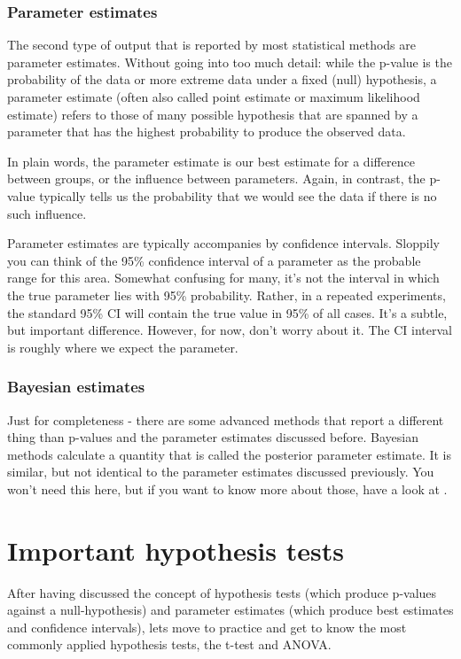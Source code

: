 \documentclass[a4paper,twoside]{tufte-book} %
\begin{document}
\subsection{Parameter estimates}

The second type of output that is reported by most statistical methods are parameter estimates. Without going into too much detail: while the p-value is the probability of the data or more extreme data under a fixed (null) hypothesis, a parameter estimate (often also called point estimate or maximum likelihood estimate) refers to those of many possible hypothesis that are spanned by a parameter that has the highest probability to produce the observed data. 

In plain words, the parameter estimate is our best estimate for a difference between groups, or the influence between parameters. Again, in contrast, the p-value typically tells us the probability that we would see the data if there is no such influence. 

Parameter estimates are typically accompanies by confidence intervals. Sloppily you can think of the 95\% confidence interval of a parameter as the probable range for this area. Somewhat confusing for many, it's not the interval in which the true parameter lies with 95\% probability. Rather, in a repeated experiments, the standard 95\% CI will contain the true value in 95\% of all cases. It's a subtle, but important difference. However, for now, don't worry about it. The CI interval is roughly where we expect the parameter. 

\subsection{Bayesian estimates}

Just for completeness - there are some advanced methods that report a different thing than p-values and the parameter estimates discussed before. Bayesian methods calculate a quantity that is called the posterior parameter estimate. It is similar, but not identical to the parameter estimates discussed previously. You won't need this here, but if you want to know more about those, have a look at \citep{Gelman-BayesianDataAnalysis-2003}.


\chapter{Important hypothesis tests}

After having discussed the concept of hypothesis tests (which produce p-values against a null-hypothesis) and parameter estimates (which produce best estimates and confidence intervals), lets move to practice and get to know the most commonly applied hypothesis tests, the t-test and ANOVA.
\end{document}
